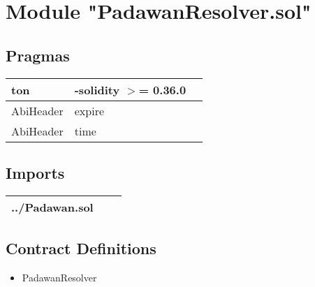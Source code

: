 
\section{Module "PadawanResolver.sol"}


\subsection{Pragmas}


\noindent\begin{tabular}{|l|l|p{5cm}|}\hline
ton & -solidity $>$= 0.36.0 &\\\hline
AbiHeader &  expire &\\\hline
AbiHeader &  time &\\\hline
\end{tabular}


\subsection{Imports}


\noindent\begin{tabular}{|l|l|p{5cm}|}\hline
../Padawan.sol &\\\hline
\end{tabular}


\subsection{Contract Definitions}

\begin{itemize}
\item PadawanResolver
\end{itemize}
